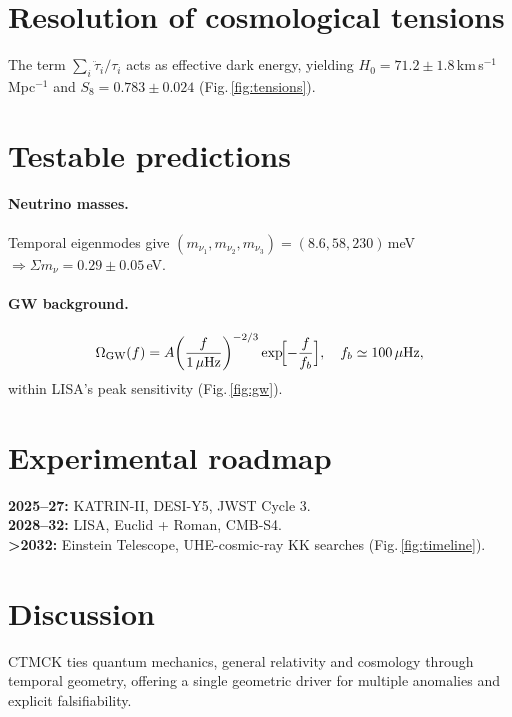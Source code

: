 \documentclass[reprint,aps,prd,amsmath,amssymb,
               nofootinbib,longbibliography]{revtex4-2}
\begin{document}
\section{Resolution of cosmological tensions}\label{sec:tensions}
The term $\sum_i \ddot{\tau}_i/\tau_i$ acts as effective dark
energy, yielding $H_0=71.2\pm1.8$\,km\,s$^{-1}$\,Mpc$^{-1}$ and
$S_8=0.783\pm0.024$ (Fig.\,\ref{fig:tensions}).

\section{Testable predictions}\label{sec:predictions}

\paragraph*{Neutrino masses.}
Temporal eigenmodes give
$(m_{\nu_1},m_{\nu_2},m_{\nu_3})=(8.6,58,230)$\,meV
$\Rightarrow \Sigma m_\nu = 0.29\pm0.05$\,eV.

\paragraph*{GW background.}
\begin{equation}
\Omega_{\mathrm{GW}}(f)
   = A\!\left(\frac{f}{1\,\mu\text{Hz}}\right)^{-2/3}
     \exp\!\Bigl[-\frac{f}{f_b}\Bigr], \quad f_b\simeq100\,\mu\text{Hz},
\end{equation}
within \textsc{LISA}'s peak sensitivity (Fig.\,\ref{fig:gw}).

\section{Experimental roadmap}\label{sec:roadmap}
\textbf{2025–27:} KATRIN-II, DESI-Y5, JWST Cycle 3.\\
\textbf{2028–32:} \textsc{LISA}, Euclid + Roman, CMB-S4.\\
\textbf{>2032:} Einstein Telescope, UHE-cosmic-ray KK searches
(Fig.\,\ref{fig:timeline}).

\section{Discussion}\label{sec:discussion}
CTMCK ties quantum mechanics, general relativity and cosmology
through temporal geometry, offering a single geometric driver
for multiple anomalies and explicit falsifiability.
\end{document}
